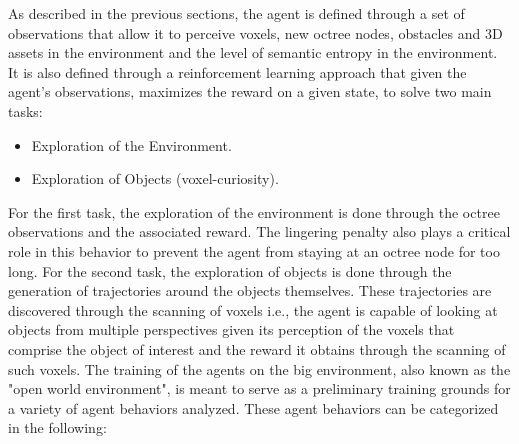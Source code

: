As described in the previous sections, the agent is defined through a set of observations that allow it to perceive voxels, new octree nodes, obstacles and 3D assets in the environment and the level of semantic entropy in the environment. It is also defined through a reinforcement learning approach that given the agent's observations, maximizes the reward on a given state, to solve two main tasks:
\begin{itemize}
    \item Exploration of the Environment.
    \item Exploration of Objects (voxel-curiosity).
\end{itemize}
For the first task, the exploration of the environment is done through the octree observations and the associated reward. The lingering penalty also plays a critical role in this behavior to prevent the agent from staying at an octree node for too long.
For the second task, the exploration of objects is done through the generation of trajectories around the objects themselves. These trajectories are discovered through the scanning of voxels i.e., the agent is capable of looking at objects from multiple perspectives given its perception of the voxels that comprise the object of interest and the reward it obtains through the scanning of such voxels. 
The training of the agents on the big environment, also known as the "open world environment", is meant to serve as a preliminary training grounds for a variety of agent behaviors analyzed. These agent behaviors can be categorized in the following:
